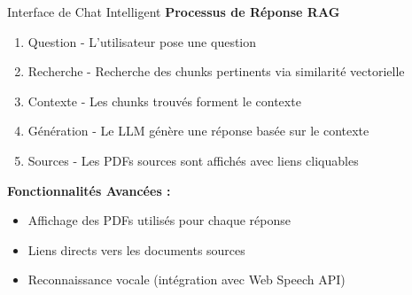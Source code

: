 \documentclass[aspectratio=169]{beamer}
\begin{document}
\begin{frame}{Interface de Chat Intelligent}
    \textbf{Processus de Réponse RAG}
    \begin{enumerate}
        \item \textcolor{primaryblue}{Question} - L'utilisateur pose une question
        \item \textcolor{primaryblue}{Recherche} - Recherche des chunks pertinents via similarité vectorielle
        \item \textcolor{primaryblue}{Contexte} - Les chunks trouvés forment le contexte
        \item \textcolor{primaryblue}{Génération} - Le LLM génère une réponse basée sur le contexte
        \item \textcolor{primaryblue}{Sources} - Les PDFs sources sont affichés avec liens cliquables
    \end{enumerate}
    
    \vspace{0.5cm}
    
    \textbf{Fonctionnalités Avancées :}
    \begin{itemize}
        \item Affichage des PDFs utilisés pour chaque réponse
        \item Liens directs vers les documents sources
        \item Reconnaissance vocale (intégration avec Web Speech API)
    \end{itemize}
\end{frame}
\end{document}
